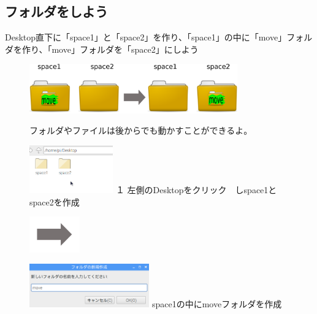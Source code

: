 \documentclass[a4paper,12pt]{jarticle}
\begin{document}
\subsection{\theExercise フォルダをしよう}
Desktop直下に「space1」と「space2」を作り、「space1」の中に「move」フォルダを作り、「move」フォルダを「space2」にしよう



\begin{figure}[ht]
  \centering
  \includegraphics[width=0.8\textwidth]{fig15-1.eps}
  \begin{minipage}{15.297cm}
    フォルダやファイルは後からでも動かすことができるよ。
  \end{minipage}

  \begin{minipage}{5.963cm}
    \includegraphics[width=3.604cm]{textbook-img051.png}
    {\flushleft
      １
      左側のDesktopをクリック　しspace1とspace2を作成
    }
  \end{minipage}
  \includegraphics[width=2.168cm]{textbook-img052.png}
  \begin{minipage}{7.473cm}
    \includegraphics[width=5.166cm]{textbook-img050.png}
    { space1の中にmoveフォルダを作成
    }
  \end{minipage}


\end{figure}
\end{document}
